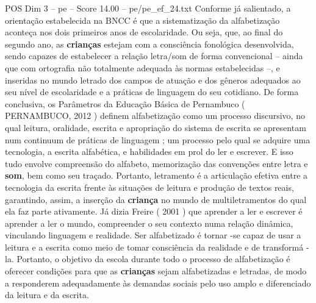 \begin{textsample}{POS Dim 3 – pe – Score 14.00 – pe/pe\_ef\_24.txt}
Conforme já salientado, a orientação estabelecida na BNCC é que a sistematização da alfabetização aconteça nos dois primeiros anos de escolaridade.
Ou seja, que, ao final do segundo ano, as \textbf{crianças} estejam com a consciência fonológica desenvolvida, sendo capazes de estabelecer a relação letra/som de forma convencional – ainda que com ortografia não totalmente adequada às normas estabelecidas –, e inseridas no mundo letrado dos campos de atuação e dos gêneros adequados ao seu nível de escolaridade e a práticas de linguagem do seu cotidiano.
De forma conclusiva, os Parâmetros da Educação Básica de Pernambuco ( PERNAMBUCO, 2012 ) definem alfabetização como um processo discursivo, no qual leitura, oralidade, escrita e apropriação do sistema de escrita se apresentam num continuum de práticas de linguagem ; um processo pelo qual se adquire uma tecnologia, a escrita alfabética, e habilidades em prol do ler e escrever.
E isso tudo envolve compreensão do alfabeto, memorização das convenções entre letra e \textbf{som}, bem como seu traçado.
Portanto, letramento é a articulação efetiva entre a tecnologia da escrita frente às situações de leitura e produção de textos reais, garantindo, assim, a inserção da \textbf{criança} no mundo de multiletramentos do qual ela faz parte ativamente.
Já dizia Freire ( 2001 ) que aprender a ler e escrever é aprender a ler o mundo, compreender o seu contexto numa relação dinâmica, vinculando linguagem e realidade.
Ser alfabetizado é tornar -se capaz de usar a leitura e a escrita como meio de tomar consciência da realidade e de transformá -la.
Portanto, o objetivo da escola durante todo o processo de alfabetização é oferecer condições para que as \textbf{crianças} sejam alfabetizadas e letradas, de modo a responderem adequadamente às demandas sociais pelo uso amplo e diferenciado da leitura e da escrita.

\end{textsample}
